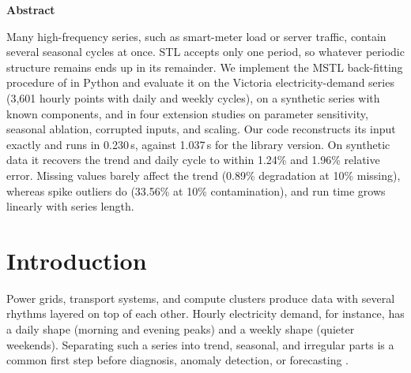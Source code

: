 \documentclass[10pt,twocolumn]{article}
\begin{document}
\thispagestyle{first}
\begingroup\renewcommand{\thefootnote}{}
\endgroup

\begin{center}{\fontsize{11}{12}\selectfont\bfseries Abstract}\end{center}
\begin{list}{}{\setlength{\leftmargin}{0.25in}\setlength{\rightmargin}{0.25in}\setlength{\topsep}{0pt}\setlength{\parsep}{0pt}}
\item Many high-frequency series, such as smart-meter load or server traffic, contain several seasonal cycles at once. STL accepts only one period, so whatever periodic structure remains ends up in its remainder. We implement the MSTL back-fitting procedure of \citet{bandara2021} in Python and evaluate it on the Victoria electricity-demand series (3,601 hourly points with daily and weekly cycles), on a synthetic series with known components, and in four extension studies on parameter sensitivity, seasonal ablation, corrupted inputs, and scaling. Our code reconstructs its input exactly and runs in 0.230\,s, against 1.037\,s for the library version. On synthetic data it recovers the trend and daily cycle to within 1.24\% and 1.96\% relative error. Missing values barely affect the trend (0.89\% degradation at 10\% missing), whereas spike outliers do (33.56\% at 10\% contamination), and run time grows linearly with series length.
\end{list}
\vskip 0.4in

\section{Introduction}
Power grids, transport systems, and compute clusters produce data with several rhythms layered on top of each other. Hourly electricity demand, for instance, has a daily shape (morning and evening peaks) and a weekly shape (quieter weekends). Separating such a series into trend, seasonal, and irregular parts is a common first step before diagnosis, anomaly detection, or forecasting \citep{hyndman2018}.
\end{document}
